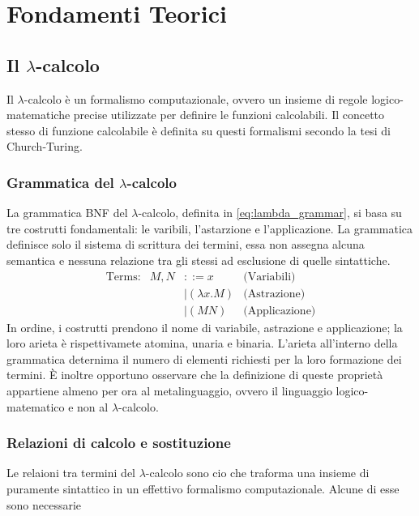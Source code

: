\chapter{Fondamenti Teorici}
\label{chap:theoretical_foundations}

\section{Il \texorpdfstring{$\lambda$}{Lambda}-calcolo}
Il $\lambda$-calcolo è un formalismo computazionale, ovvero un insieme di regole logico-matematiche 
precise utilizzate per definire le funzioni calcolabili. Il concetto stesso di funzione calcolabile è 
definita su questi formalismi secondo la tesi di Church-Turing. 

\subsection{Grammatica del \texorpdfstring{$\lambda$}{Lambda}-calcolo}
La grammatica BNF del $\lambda$-calcolo, definita in \eqref{eq:lambda_grammar}, si basa su tre costrutti fondamentali:
le varibili, l'astarzione e l'applicazione. La grammatica definisce solo il sistema di scrittura dei termini, 
essa non assegna alcuna semantica e nessuna relazione tra gli stessi ad esclusione di quelle sintattiche.
\begin{equation}
    \begin{array}{lrll}
        \text{Terms:}   & M, N & ::= x               & \text{(Variabili)}   \\
                        &      & \mid (\lambda x. M) & \text{(Astrazione)}  \\
                        &      & \mid (M N)          & \text{(Applicazione)}
    \end{array}
    \label{eq:lambda_grammar}
\end{equation}
In ordine, i costrutti prendono il nome di variabile, astrazione e applicazione; la loro arieta è rispettivamete atomina, unaria e binaria.
L'arieta all'interno della grammatica deternima il numero di elementi richiesti per la loro formazione dei termini. È inoltre opportuno osservare 
che la definizione di queste proprietà appartiene almeno per ora al metalinguaggio, ovvero il linguaggio logico-matematico e non al $\lambda$-calcolo.
    
\subsection{Relazioni di calcolo e sostituzione}
Le relaioni tra termini del $\lambda$-calcolo sono cio che traforma una insieme di puramente sintattico in un effettivo formalismo computazionale. 
Alcune di esse sono necessarie 

